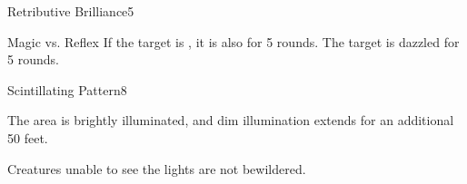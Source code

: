 \begin{spellfooter}
\begin{spellsection}{Retributive Brilliance}{5}
\begin{spellsubcontent}
\begin{spelleffects}
\begin{spellattack}{Magic vs. Reflex}
                If the target is \bloodied, it is also \blinded for 5 rounds.
                \spellfailure The target is dazzled for 5 rounds.
            \end{spellattack}
        \end{spelleffects}
    \end{spellsubcontent}
    \begin{spellfooter}
    \end{spellfooter}
\end{spellsection}

\begin{spellsection}{Scintillating Pattern}{8}
    \begin{spellheader}
    \end{spellheader}
    \begin{spellcontent}
        \begin{spelltargetinginfo}
        \end{spelltargetinginfo}
        \begin{spelleffects}
            \spelleffect The area is brightly illuminated, and dim illumination extends for an additional 50 feet.
            \spelldur \durshort
        \end{spelleffects}
    \end{spellcontent}
    \begin{spellfooter}
        \spellnotes Creatures unable to see the lights are not bewildered.
    \end{spellfooter}
\end{spellsection}


\end{spellfooter}
